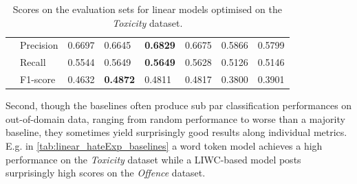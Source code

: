 \begin{table}[]
\begin{minipage}{0.42\paperheight}
{\begin{tabular}{ll|ll|ll|ll}
                                        & Precision & 0.6697 & 0.6645            & \bf{0.6829} & 0.6675      & 0.5866 & 0.5799          \\  
                                        & Recall    & 0.5544 & 0.5649            & \bf{0.5649} & 0.5628      & 0.5126 & 0.5146          \\  
                                        & F1-score  & 0.4632 & \bf{0.4872}       & 0.4811      & 0.4817      & 0.3800 & 0.3901  
    \end{tabular}%
    }  
    \caption{Scores on the evaluation sets for linear models optimised on the \textit{Toxicity} dataset.}  
    \label{tab:linear_toxicity_baselines}  
    \end{minipage}  
\end{table}  
  
Second, though the baselines often produce sub par classification performances on out-of-domain data, ranging from random performance to worse than a majority baseline, they sometimes yield surprisingly good results along individual metrics.  
E.g. in \cref{tab:linear_hateExp_baselines} a word token model achieves a high performance on the \textit{Toxicity} dataset while a LIWC-based model posts surprisingly high scores on the \textit{Offence} dataset.  
  
